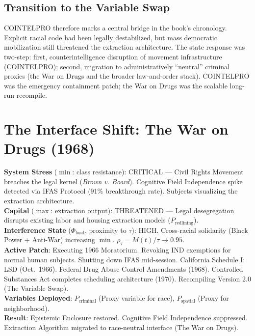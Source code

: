 \subsection{Transition to the Variable Swap}

COINTELPRO therefore marks a central bridge in the book's chronology. Explicit racial code had been legally destabilized, but mass democratic mobilization still threatened the extraction architecture. The state response was two-step: first, counterintelligence disruption of movement infrastructure (COINTELPRO); second, migration to administratively ``neutral'' criminal proxies (the War on Drugs and the broader law-and-order stack). COINTELPRO was the emergency containment patch; the War on Drugs was the scalable long-run recompile.

\section{The Interface Shift: The War on Drugs (1968)}

\begin{tcolorbox}[colback=black!5, colframe=black!70, fonttitle=\bfseries\ttfamily, title=RUNTIME LOG: 1966 (SECURITY PATCH)]
\ttfamily\small
\textbf{System Stress} ($\min$: class resistance): CRITICAL --- Civil Rights Movement breaches the legal kernel (\textit{Brown v. Board}). Cognitive Field Independence spike detected via IFAS Protocol (91\% breakthrough rate). Subjects visualizing the extraction architecture.\\
\textbf{Capital} ($\max$: extraction output): THREATENED --- Legal desegregation disrupts existing labor and housing extraction models ($P_{\text{redlining}}$).\\
\textbf{Interference State} ($\Phi_{\text{load}}$, proximity to $\tau$): HIGH. Cross-racial solidarity (Black Power + Anti-War) increasing $\min$. $\rho_{\tau}=M(t)/\tau \rightarrow 0.95$.\\
\textbf{Active Patch}: Executing 1966 Moratorium. Revoking IND exemptions for normal human subjects. Shutting down IFAS mid-session. California Schedule I: LSD (Oct.\ 1966). Federal Drug Abuse Control Amendments (1968). Controlled Substances Act completes scheduling architecture (1970). Recompiling Version 2.0 (The Variable Swap).\\
\textbf{Variables Deployed}: $P_{\text{criminal}}$ (Proxy variable for race), $P_{\text{spatial}}$ (Proxy for neighborhood).\\
\textbf{Result}: Epistemic Enclosure restored. Cognitive Field Independence suppressed. Extraction Algorithm migrated to race-neutral interface (The War on Drugs).
\end{tcolorbox}

